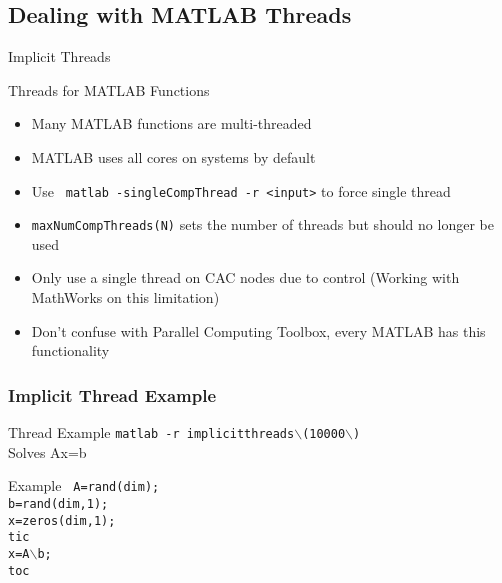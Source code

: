 \documentclass[handout]{beamer}
\begin{document}
   \subsection{Dealing with MATLAB Threads}
  \begin{frame}{Implicit Threads}
   \begin{block}{Threads for MATLAB Functions}
    \begin{itemize}
     \item Many MATLAB functions are multi-threaded
     \item MATLAB uses all cores on systems by default
     \item Use \texttt{ matlab -singleCompThread -r <input>} to force single thread
     \item \texttt{maxNumCompThreads(N)} sets the number of threads but should no longer be used
     \item Only use a single thread on CAC nodes due to control (Working with MathWorks on this limitation)
     \item Don't confuse with Parallel Computing Toolbox, every MATLAB has this functionality
    \end{itemize}
   \end{block}
  \end{frame}

\begin{frame}[fragile]
\frametitle{Implicit Thread Example}
   \begin{block}{Thread Example}
\texttt{matlab -r implicitthreads$\backslash$(10000$\backslash$)} \\
Solves Ax=b
   \end{block}
   \begin{block}{Example}
    \texttt{
A=rand(dim); \\
b=rand(dim,1); \\
x=zeros(dim,1); \\
tic \\
x=A$\backslash$b;\\
toc  }
  \end{block}
\end{frame}
\end{document}
